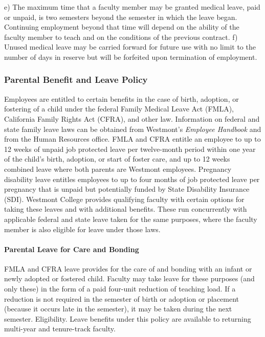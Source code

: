 \documentclass[letterpaper, 11pt]{article}
\begin{document}
			e) The maximum time that a faculty member may be granted medical leave, paid or unpaid, is two semesters beyond the semester in which the leave began.  Continuing employment beyond that time will depend on the ability of the faculty member to teach and on the conditions of the previous contract.
			f) Unused medical leave may be carried forward for future use with no limit to the number of days in reserve but will be forfeited upon termination of employment.

		\subsubsection{Parental Benefit and Leave Policy}
			Employees are entitled to certain benefits in the case of birth, adoption, or fostering of a child under the federal Family Medical Leave Act (FMLA), California Family Rights Act (CFRA), and other law. Information on federal and state family leave laws can be obtained from Westmont's \emph{Employee Handbook} and from the Human Resources office. FMLA and CFRA entitle an employee to up to 12 weeks of unpaid job protected leave per twelve-month period within one year of the child's birth, adoption, or start of foster care, and up to 12 weeks combined leave where both parents are Westmont employees. Pregnancy disability leave entitles employees to up to four months of job protected leave per pregnancy that is unpaid but potentially funded by State Disability Insurance (SDI).
			Westmont College provides qualifying faculty with certain options for taking these leaves and with additional benefits. These run concurrently with applicable federal and state leave taken for the same purposes, where the faculty member is also eligible for leave under those laws.

			\paragraph{Parental Leave for Care and Bonding}
				FMLA and CFRA leave provides for the care of and bonding with an infant or newly adopted or fostered child. Faculty may take leave for these purposes (and only these) in the form of a paid four-unit reduction of teaching load. If a reduction is not required in the semester of birth or adoption or placement (because it occurs late in the semester), it may be taken during the next semester.
				Eligibility. Leave benefits under this policy are available to returning multi-year and tenure-track faculty.
\end{document}
